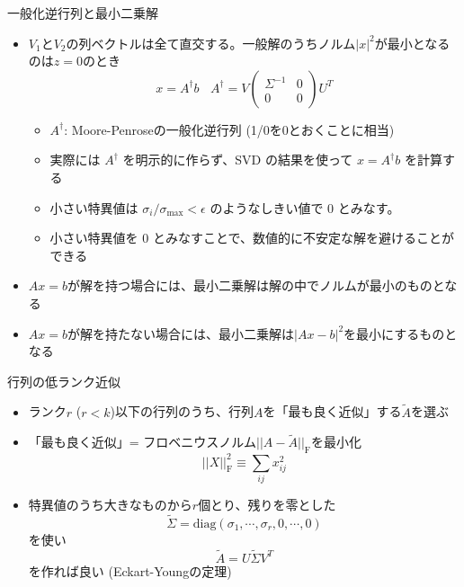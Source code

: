 \begin{frame}[t,fragile]{一般化逆行列と最小二乗解}
  \begin{itemize}
  \item $V_1$と$V_2$の列ベクトルは全て直交する。一般解のうちノルム$|x|^2$が最小となるのは$z=0$のとき
    \[
    x = A^\dagger b \ \ \ \ A^\dagger = V \begin{pmatrix} \Sigma^{-1} & 0 \\ 0 & 0 \end{pmatrix} U^T
    \]
    \begin{itemize}
    \item $A^\dagger$: Moore-Penroseの一般化逆行列 (1/0を0とおくことに相当)
    \item 実際には \(A^\dagger\) を明示的に作らず、SVD の結果を使って \(x=A^\dagger b\) を計算する
    \item 小さい特異値は \(\sigma_i/\sigma_{\max}<\epsilon\) のようなしきい値で 0 とみなす。
    \item 小さい特異値を 0 とみなすことで、数値的に不安定な解を避けることができる
    \end{itemize}
  \item $Ax=b$が解を持つ場合には、最小二乗解は解の中でノルムが最小のものとなる
  \item $Ax=b$が解を持たない場合には、最小二乗解は$|Ax-b|^2$を最小にするものとなる
  \end{itemize}
\end{frame}

\begin{frame}[t,fragile]{行列の低ランク近似}
  \begin{itemize}
  \item ランク$r$ ($r<k$)以下の行列のうち、行列$A$を「最も良く近似」する$\tilde{A}$を選ぶ
  \item 「最も良く近似」= フロベニウスノルム$||A-\tilde{A}||_\mathrm{F}$を最小化
    \[
    ||X||^2_\mathrm{F} \equiv \sum_{ij} x_{ij}^2
    \]
  \item 特異値のうち大きなものから$r$個とり、残りを零とした
    \[
    \tilde{\Sigma} = \text{diag}(\sigma_1,\cdots,\sigma_r,0,\cdots,0)
    \]
    を使い
    \[
    \tilde{A} = U \tilde{\Sigma} V^T
    \]
    を作れば良い (Eckart-Youngの定理)
  \end{itemize}
\end{frame}

